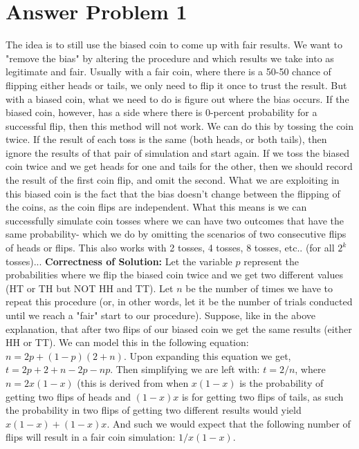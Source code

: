 \documentclass[letterpaper, 11pt]{article}
\begin{document}
\section*{Answer Problem 1}
The idea is to still use the biased coin to come up with fair results. We want to "remove the bias" by altering the procedure and which results we take into as legitimate and fair. Usually with a fair coin, where there is a 50-50 chance of flipping either heads or tails, we only need to flip it once to trust the result. But with a biased coin, what we need to do is figure out where the bias occurs. If the biased coin, however, has a side where there is 0-percent probability for a successful flip, then this method will not work. We can do this by tossing the coin twice. If the result of each toss is the same (both heads, or both tails), then ignore the results of that pair of simulation and start again. If we toss the biased coin twice and we get heads for one and tails for the other, then we should record the result of the first coin flip, and omit the second. What we are exploiting in this biased coin is the fact that the bias doesn't change between the flipping of the coins, as the coin flips are independent. What this means is we can successfully simulate coin tosses where we can have two outcomes that have the same probability- which we do by omitting the scenarios of two consecutive flips of heads or flips. This also works with 2 tosses, 4 tosses, 8 tosses, etc.. (for all $2^k$ tosses)...
\newline
\newline
\textbf{Correctness of Solution:}
\newline
Let the variable $p$ represent the probabilities where we flip the biased coin twice and we get two different values (HT or TH but NOT HH and TT). Let $n$ be the number of times we have to repeat this procedure (or, in other words, let it be the number of trials conducted until we reach a "fair" start to our procedure). Suppose, like in the above explanation, that after two flips of our biased coin we get the same results (either HH or TT). We can model this in the following equation: $n = 2p + (1-p)(2+n)$. Upon expanding this equation we get, $t = 2p + 2 + n - 2p - np$. Then simplifying we are left with: $t = 2/n$, where $n = 2x(1-x)$ (this is derived from when $x(1-x)$ is the probability of getting two flips of heads and $(1-x)x$ is for getting two flips of tails, as such the probability in two flips of getting two different results would yield $x(1-x) + (1-x)x$. And such we would expect that the following number of flips will result in a fair coin simulation: $1/x(1-x)$. 
\end{document}
